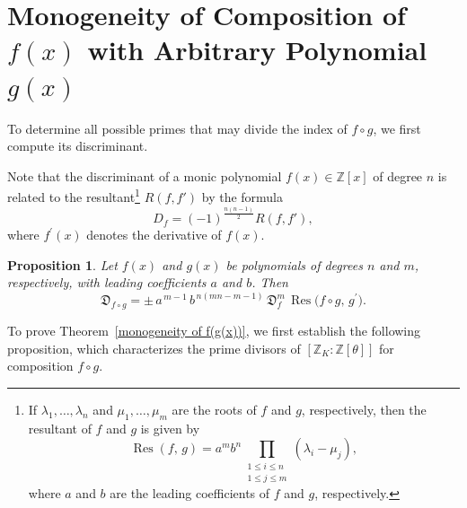 \documentclass[table]{amsart}
\newtheorem{proposition}[theorem]{Proposition}
\newcommand{\D}{\mathfrak{D}}
\DeclareMathOperator{\Res}{Res}
\numberwithin{equation}{section}
\begin{document}
\section[Monogeneity of Composition of f(x) with Arbitrary Polynomial g(x)]{Monogeneity of Composition of \texorpdfstring{$f(x)$}{f(x)} with Arbitrary Polynomial \texorpdfstring{$g(x)$}{g(x)}}
To determine all possible primes that may divide the index of $f \circ g$, 
we first compute its discriminant. 


Note that the discriminant of a monic polynomial $f(x) \in \mathbb{Z}[x]$ of degree $n$ 
is related to the resultant\footnote{\noindent If $\lambda_1,\ldots,\lambda_n$ and
$\mu_1,\ldots,\mu_m$ are the roots of $f$ and $g$, respectively, then the
resultant of $f$ and $g$ is given by
\[
\Res(f,\,g)
=
a^m b^n
\prod_{\substack{1 \le i \le n \\ 1 \le j \le m}}
(\lambda_i-\mu_j),
\] where $a$ and $b$ are the leading coefficients of $f$ and $g$, respectively.} $R(f, f')$ by the formula
\[
D_f = (-1)^{\frac{n(n-1)}{2}} R(f, f'),
\]
where $f^{\prime}(x)$ denotes the derivative of $f(x)$. 
\begin{proposition}\label{prop:disc_comp}
Let $f(x)$ and $g(x)$ be polynomials of degrees $n$ and $m$, respectively, 
with leading coefficients $a$ and $b$. Then
\begin{equation}\label{disc f of g}
\D_{f \circ g} 
= \pm\, a^{\,m-1}\, b^{\,n(mn - m - 1)} \,
\D_f^{m} \,
\operatorname{Res}\bigl(f\circ g,\, g^{\prime}\bigr).
\end{equation}
\end{proposition}
To prove Theorem~\ref{monogeneity of f(g(x))}, we first establish the following proposition, which characterizes the prime divisors of \( [\mathbb{Z}_K : \mathbb{Z}[\theta]] \) for composition $f\circ g$.
\end{document}
